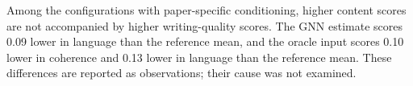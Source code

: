 Among the configurations with paper-specific conditioning, higher content scores are not accompanied by higher writing-quality scores. The GNN estimate scores 0.09 lower in language than the reference mean, and the oracle input scores 0.10 lower in coherence and 0.13 lower in language than the reference mean. These differences are reported as observations; their cause was not examined.

